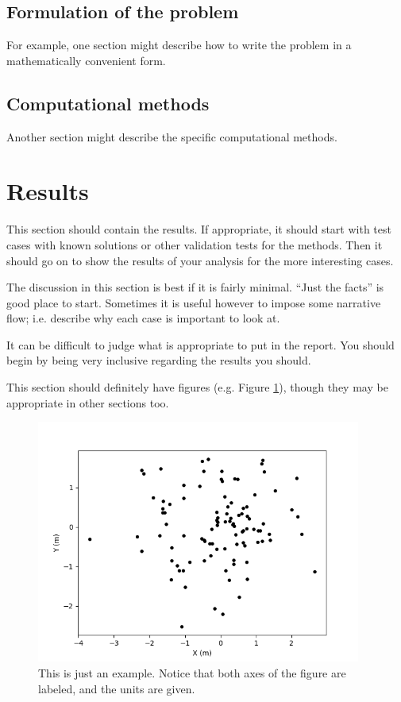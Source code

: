 \documentclass[11pt]{article}
\begin{document}
\subsection{Formulation of the problem}
\label{sec:formulation}

For example, one section might describe how to write the problem in a
mathematically convenient form.

\subsection{Computational methods}
\label{sec:computational}

Another section might describe the specific computational methods.

\section{Results}
\label{sec:results}

This section should contain the results. If appropriate, it should
start with test cases with known solutions or other validation tests
for the methods. Then it should go on to show the results of your
analysis for the more interesting cases.

The discussion in this section is best if it is fairly minimal. ``Just
the facts'' is good place to start. Sometimes it is useful however to
impose some narrative flow; i.e. describe why each case is important
to look at.

It can be difficult to judge what is appropriate to put in the
report. You should begin by being very inclusive regarding the results
you should.

This section should definitely have figures (e.g. Figure
\ref{fig:example}), though they may be appropriate in other sections
too.

\begin{figure}[b!]
\centering
\includegraphics[width=0.95\textwidth]{scatter.png}
\caption{ \label{fig:example} This is just an example. Notice that
  both axes of the figure are labeled, and the units are given.}
\end{figure}
  
\end{document}

